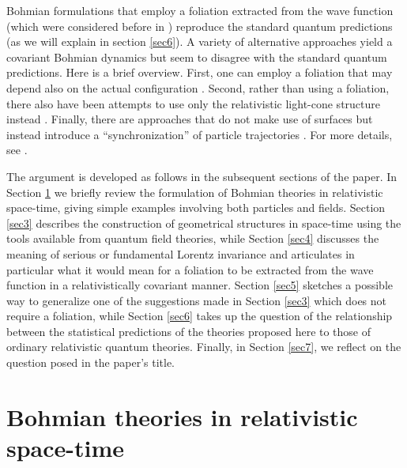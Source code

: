 \documentclass[12pt]{article}
\begin{document}
Bohmian formulations that employ a foliation extracted from the wave function (which were considered before in \cite{duerr90,duerr99}) reproduce the standard quantum predictions (as we will explain in section \ref{sec6}). A variety of alternative approaches yield a covariant Bohmian dynamics but seem to disagree with the standard quantum predictions. Here is a brief overview. First, one can employ a foliation that may depend also on the actual configuration \cite{bell84,duerr90,horton04}. Second, rather than using a foliation, there also have been attempts to use only the relativistic light-cone structure instead \cite{squires93,goldstein03}. Finally, there are approaches that do not make use of surfaces but instead introduce a ``synchronization'' of particle trajectories \cite{berndl96a,horton01,dewdney02,nikolic05b}. For more details, see \cite{tumulka07}.


The argument is developed as follows in the subsequent sections of the
paper.  In Section \ref{sec2} we briefly review the formulation of
Bohmian theories in relativistic space-time, giving simple examples
involving both particles and fields.  Section \ref{sec3} describes the
construction of geometrical structures in space-time using the tools
available from quantum field
theories, while Section \ref{sec4} discusses the meaning of serious or
fundamental Lorentz invariance and articulates in particular what it
would mean for a foliation to be extracted from the wave function in a
relativistically covariant manner.  Section \ref{sec5}
sketches a possible way to generalize one of the suggestions made in
Section \ref{sec3} which does not require a foliation, while Section \ref{sec6} takes up the question of
the relationship between the statistical predictions of the theories
proposed here to those of ordinary relativistic quantum theories.
Finally, in Section \ref{sec7}, we reflect on the question posed in the paper's title.



\section{Bohmian theories in relativistic space-time}
\label{sec2}
\end{document}
